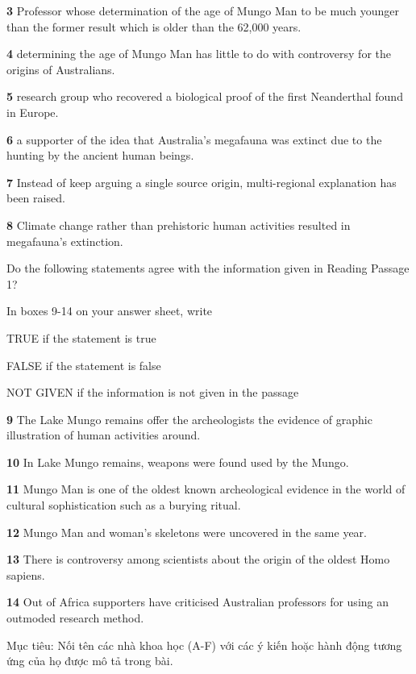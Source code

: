 \documentclass{../templateReading/cdreading}
\begin{document}
\textbf{3} Professor whose determination of the age of Mungo Man to be much younger than the former result which is older than the 62,000 years.

\textbf{4} determining the age of Mungo Man has little to do with controversy for the origins of Australians.

\textbf{5} research group who recovered a biological proof of the first Neanderthal found in Europe.

\textbf{6} a supporter of the idea that Australia’s megafauna was extinct due to the hunting by the ancient human beings.

\textbf{7} Instead of keep arguing a single source origin, multi-regional explanation has been raised.

\textbf{8} Climate change rather than prehistoric human activities resulted in megafauna’s extinction.


Do the following statements agree with the information given in Reading Passage 1?

In boxes 9-14 on your answer sheet, write

TRUE               if the statement is true

FALSE              if the statement is false

NOT GIVEN    if the information is not given in the passage

\textbf{9} The Lake Mungo remains offer the archeologists the evidence of graphic illustration of human activities around.

\textbf{10} In Lake Mungo remains, weapons were found used by the Mungo.

\textbf{11} Mungo Man is one of the oldest known archeological evidence in the world of cultural sophistication such as a burying ritual.

\textbf{12} Mungo Man and woman’s skeletons were uncovered in the same year.

\textbf{13} There is controversy among scientists about the origin of the oldest Homo sapiens.

\textbf{14} Out of Africa supporters have criticised Australian professors for using an outmoded research method.



Mục tiêu: Nối tên các nhà khoa học (A-F) với các ý kiến hoặc hành động tương ứng của họ được mô tả trong bài.
\end{document}
